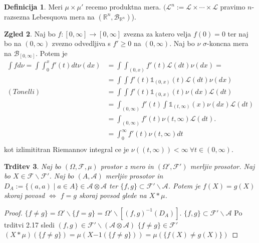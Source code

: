 \documentclass[a4paper,12pt]{article}
\theoremstyle{definition} %
\newtheorem{definicija}{Definicija}[section]
\newtheorem{zgled}[definicija]{Zgled}
\theoremstyle{plain} %
\newtheorem{trditev}[definicija]{Trditev}
\newcommand{\R}{\mathbb{R}}
\newcommand{\F}{\mathcal{F}}
\newcommand{\A}{\mathcal{A}}
\begin{document}
            \begin{definicija}
                Meri $\mu \times \mu'$ recemo produktna mera. $(\mathcal{L}^n:= \mathcal{L}\times \cdots \times\mathcal{L}$ 
                pravimo $n$-razsezna Lebesquova mera na $(\R^n, \mathcal{B}_{\R^n})$). 
            \end{definicija}

            \begin{zgled}
                Naj bo $f:[0, \infty] \rightarrow [0, \infty]$ zvezna za katero velja $f(0) = 0$ ter naj bo na $(0, \infty)$ zvezno odvedljiva s $f'\geq 0$ na $(0, \infty)$. Naj bo $\nu$ $\sigma$-koncna mera na $\mathcal{B}_{[0, \infty]}.$ Potem je 
                \begin{align*}
                    \int f d\nu = \int \int_{0}^x f'(t)dt \nu(dx) &= \int \int_{(0, x)}f'(t)\mathcal{L}(dt)\nu(dx) = \\
                    &=\int \int f'(t)\mathds{1}_{(0, x)}(t)\mathcal{L}(dt)\nu(dx)\\
                    (Tonelli) &= \int \int f'(t)\mathds{1}_{(0, x)}(t)\nu(dx)\mathcal{L}(dt) \\
                    &= \int_{(0, \infty)}f'(t)\int \mathds{1}_{(t, \infty)}(x)\nu(dx)\mathcal{L}(dt) \\
                    &= \int_{(0, \infty)}f'(t)\nu(t, \infty)\mathcal{L}(dt). \\
                    &= \int_0^\infty f'(t)\nu(t, \infty)dt \\
                \end{align*}
                kot izlimititran Riemannov integral ce je $\nu((t, \infty)) < \infty \ \forall t\in(0, \infty)$.
            \end{zgled}

            \begin{trditev}
                Naj bo $(\Omega, \F, \mu)$ prostor z mero in $(\Omega', \F')$ merljiv prosotor. Naj bo $X \in \F\backslash\F'$. 
                Naj bo $(A, \A)$ merljiv prosotor in $D_A:= \{(a, a)\mid a\in A\} \in \A\otimes\A$ ter $\{f, g\}\subset \F'\backslash\A$.
                Potem je $f(X) = g(X)$ skoraj povosd $\iff$ $f = g$ skoraj povsod glede na $X*\mu$.
            \end{trditev}
            
            \begin{proof}
                $\{f \neq g\} = \Omega'\backslash\{f = g\} = \Omega'\backslash\left[(f, g)^{-1}(D_A)\right]$.
                $\{f, g\}\subset \F'\backslash\A$ Po trditvi 2.17 sledi $(f, g) \in \F'\backslash(\A\otimes\A)$
                $\{f \neq g\} \in \F'$
                $(X*\mu)(\{f\neq g\}) = \mu(X{-1}(\{f\neq g\})) = \mu(\{f(X)\neq g(X)\})$
            \end{proof}
\end{document}
